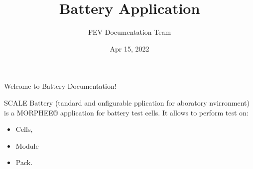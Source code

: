 \documentclass[letterpaper,10pt,english]{jupyterBook}
\title{Battery Application}
\date{Apr 15, 2022}
\author{FEV Documentation Team}
\begin{document}
\pagestyle{empty}
\sphinxmaketitle
\pagestyle{plain}
\sphinxtableofcontents
\pagestyle{normal}
\label{\detokenize{index::doc}}


\sphinxAtStartPar
Welcome to  Battery Documentation!
\begin{quote}

\sphinxAtStartPar
{}
\end{quote}

\sphinxAtStartPar
SCALE Battery (tandard and onfigurable pplication for aboratory nvirronment) is a MORPHEE® application for battery test cells. It allows to perform test on:
\begin{itemize}
\item {} 
\sphinxAtStartPar
Cells,

\item {} 
\sphinxAtStartPar
Module

\item {} 
\sphinxAtStartPar
Pack.

\end{itemize}
\end{document}
